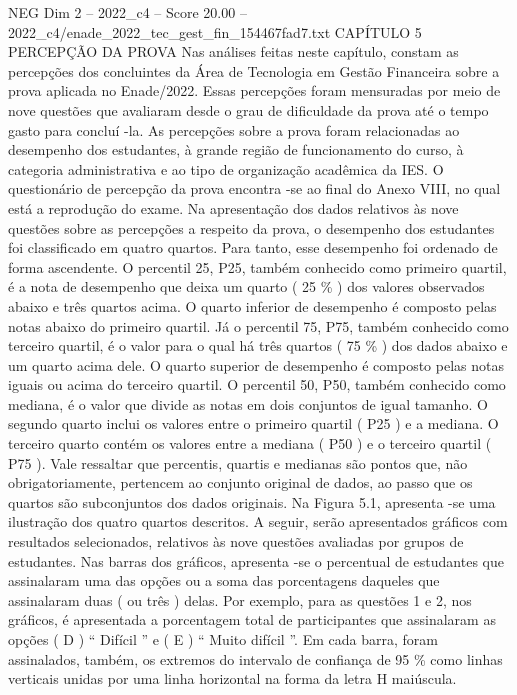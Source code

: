 \begin{textsample}{NEG Dim 2 – 2022\_c4 – Score 20.00 – 2022\_c4/enade\_2022\_tec\_gest\_fin\_154467fad7.txt}  \label{ex:f2_neg_412}
CAPÍTULO 5 PERCEPÇÃO DA PROVA Nas análises feitas neste capítulo, constam as percepções dos concluintes da Área de Tecnologia em Gestão Financeira sobre a prova aplicada no Enade/2022.
Essas percepções foram mensuradas por meio de nove questões que avaliaram desde o grau de dificuldade da prova até o tempo gasto para concluí -la.
As percepções sobre a prova foram relacionadas ao desempenho dos estudantes, à grande região de funcionamento do curso, à categoria administrativa e ao tipo de organização acadêmica da IES.
O questionário de percepção da prova encontra -se ao final do Anexo VIII, no qual está a reprodução do exame.
Na apresentação dos dados relativos às nove questões sobre as percepções a respeito da prova, o desempenho dos estudantes foi classificado em quatro quartos.
Para tanto, esse desempenho foi ordenado de forma ascendente.
O percentil 25, P25, também conhecido como primeiro quartil, é a nota de desempenho que deixa um quarto ( 25 \% ) dos valores observados abaixo e três quartos acima.
O quarto inferior de desempenho é composto pelas notas abaixo do primeiro quartil.
Já o percentil 75, P75, também conhecido como terceiro quartil, é o valor para o qual há três quartos ( 75 \% ) dos dados abaixo e um quarto acima dele.
O quarto superior de desempenho é composto pelas notas iguais ou acima do terceiro quartil.
O percentil 50, P50, também conhecido como mediana, é o valor que divide as notas em dois conjuntos de igual tamanho.
O segundo quarto inclui os valores entre o primeiro quartil ( P25 ) e a mediana.
O terceiro quarto contém os valores entre a mediana ( P50 ) e o terceiro quartil ( P75 ).
Vale ressaltar que percentis, quartis e medianas são pontos que, não obrigatoriamente, pertencem ao conjunto original de dados, ao passo que os quartos são subconjuntos dos dados originais.
Na Figura 5.1, apresenta -se uma ilustração dos quatro quartos descritos.
A seguir, serão apresentados gráficos com resultados selecionados, relativos às nove questões avaliadas por grupos de estudantes.
Nas barras dos gráficos, apresenta -se o percentual de estudantes que assinalaram uma das opções ou a soma das porcentagens daqueles que assinalaram duas ( ou três ) delas.
Por exemplo, para as questões 1 e 2, nos gráficos, é apresentada a porcentagem total de participantes que assinalaram as opções ( D ) “ Difícil ” e ( E ) “ Muito difícil ”.
Em cada barra, foram assinalados, também, os extremos do intervalo de confiança de 95 \% como linhas verticais unidas por uma linha horizontal na forma da letra H maiúscula.

\end{textsample}

